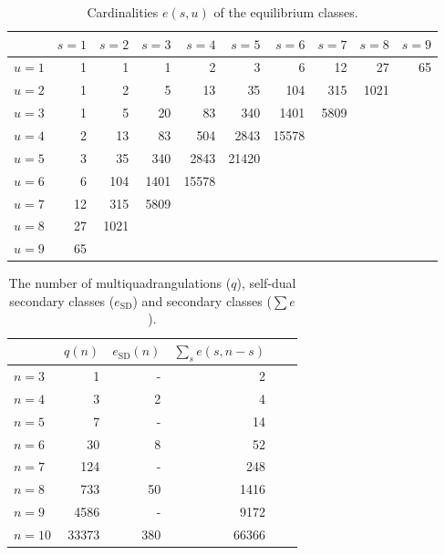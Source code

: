\documentclass[]{article}
\newcommand{\maps}{|\mathcal{I}^+|}\newcommand{\quads}{|\mathscr{Q}|}\newcommand{\sdquads}{|\mathscr{Q}_\text{SD}|}\renewcommand{\maps}{e}\renewcommand{\quads}{q}\renewcommand{\sdquads}{e_\text{SD}}
\newcommand{\nfour}{}
\newcommand{\neight}{}
\newcommand{\ntwelve}{}
\newcommand{\nsteen}{}
\begin{document}
\begin{table}[p]\centering
  \begin{tabular}{rrrrrrrrrr}
    \hline
    {\ }  & $s=1$
    & $s=2$ & $s=3$ & $s=4$ & $s=5$ & $s=6$ & $s=7$ & $s=8$ & $s=9$ \\
    \hline
    $u=1$& {1} & \nfour 1   & 1    & \neight 2    & 3   & \ntwelve 6    & 12  & \nsteen 27 & 65\\
    $u=2$&\nfour 1  & 2   & \neight 5    & 13   & \ntwelve 35  & 104  & \nsteen 315 &1021\\
    $u=3$& 1  & \neight 5   & 20 & \ntwelve 83  & 340 & \nsteen 1401 &5809\\
    $u=4$&\neight 2  & 13  & \ntwelve 83   & 504 & \nsteen 2843 &15578\\
    $u=5$& 3  & \ntwelve 35  & 340  & \nsteen 2843 &21420\\
    $u=6$&\ntwelve 6  & 104 & \nsteen 1401 &15578\\
    $u=7$& 12 & \nsteen 315 &5809\\
    $u=8$&\nsteen 27 &1021\\
    $u=9$ &65\\
    \hline
  \end{tabular}
\caption{Cardinalities $\maps(s,u)$ of the equilibrium classes.}
  \label{tab:cardinalities}
\end{table}

\begin{table}\centering
  \begin{tabular}{lrrrrr}
    \hline
    & $\quads(n)$ & $\sdquads(n)$ & $\sum_s\maps(s,n-s)$\\
    \hline
$n=3$  &     1 &     - &     2\\
    $n=4$  &     3 &     2 &     4\\
    $n=5$  &     7 &     - &    14\\
    $n=6$  &    30 &     8 &    52\\
    $n=7$  &   124 &     - &   248\\
    $n=8$  &   733 &    50 &  1416\\
    $n=9$  &  4586 &     - &  9172\\
    $n=10$ & 33373 &   380 & 66366\\
    \hline
  \end{tabular}
  \caption{The number of multiquadrangulations ($\quads$), self-dual secondary classes ($\sdquads$) and secondary classes ($\sum e$).}
  \label{tab:q}
\end{table}
\end{document}
